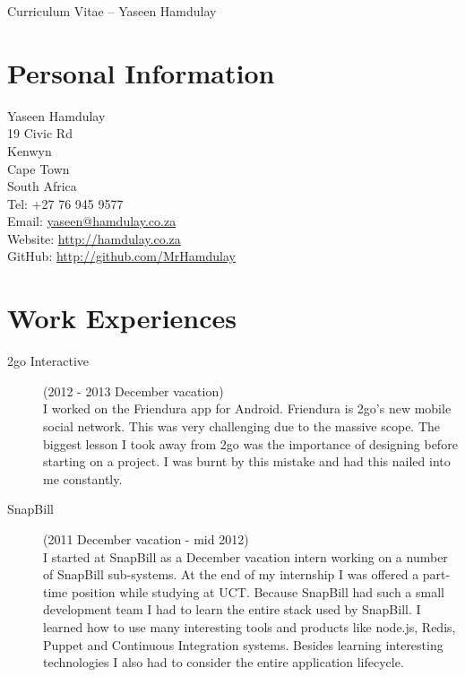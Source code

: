 \documentclass[margin,line,a4paper]{resume}
\begin{document}
    {\sc \Large Curriculum Vitae -- Yaseen Hamdulay}
    \begin{resume}
        \vspace{0.5cm}

        \section{\mysidestyle Personal Information}
            Yaseen Hamdulay\\
            19 Civic Rd\\ %
            Kenwyn\\
            Cape Town\\
            South Africa\\
            Tel: +27 76 945 9577\\
            Email: \href{mailto:yaseen@hamdulay.co.za}{yaseen@hamdulay.co.za}\\
            Website: \href{http://hamdulay.co.za}{http://hamdulay.co.za}\\
            GitHub: \href{http://github.com/MrHamdulay}{http://github.com/MrHamdulay}\\

        \section{\mysidestyle Work Experiences}
            \begin{description}
                \item[2go Interactive] (2012 - 2013 December vacation) \\
                    I worked on the Friendura app for Android. Friendura is 2go's new mobile social network. This was very challenging due to the massive scope. The biggest lesson I took away from 2go was the importance of designing before starting on a project. I was burnt by this mistake and had this nailed into me constantly.
                \item[SnapBill] (2011 December vacation - mid 2012) \\
                    I started at SnapBill as a December vacation intern working on a number of SnapBill sub-systems. At the end of my internship I was offered a part-time position while studying at UCT. Because SnapBill had such a small development team I had to learn the entire stack used by SnapBill. I learned how to use many interesting tools and products like node.js, Redis, Puppet and Continuous Integration systems. Besides learning interesting technologies I also had to
                    consider the entire application lifecycle. 


\end{description}
\end{resume}
\end{document}

